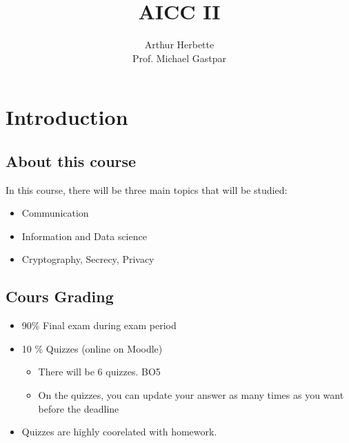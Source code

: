\documentclass[11pt]{book}
\author{Arthur Herbette \\
Prof. Michael Gastpar}
\begin{document}
\setcounter{section}{8}
\title{AICC II}
\maketitle
\thispagestyle{empty}
\tableofcontents
\thispagestyle{empty}
\listoflectures

\chapter{Introduction}
\section{About this course}
In this course, there will be three main topics that will be studied:
\begin{itemize}
    \item Communication
    \item Information and Data science
    \item Cryptography, Secrecy, Privacy
\end{itemize}

\section{Cours Grading}
    \begin{itemize}
        \item 90\% Final exam during exam period
        \item 10 \% Quizzes (online on Moodle)
        \begin{itemize}
            \item There will be $6$ quizzes. BO5
            \item On the quizzes, you can update your answer as many times as you want before the deadline
        \end{itemize}
        \item Quizzes are highly coorelated with homework.
    \end{itemize}
\end{document}
